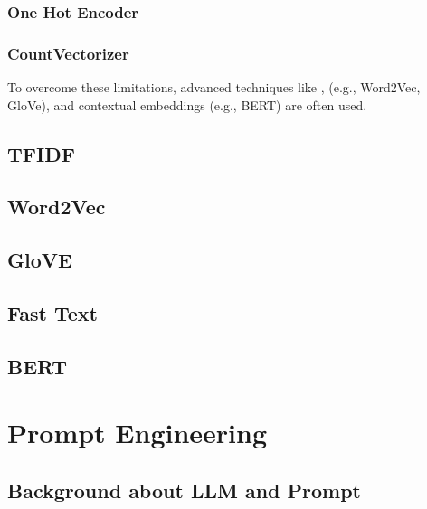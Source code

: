 \documentclass[letterpaper,11pt,english]{sphinxmanual}
\begin{document}
\subsection{One Hot Encoder}
\label{\detokenize{embedding:one-hot-encoder}}

\subsection{CountVectorizer}
\label{\detokenize{embedding:countvectorizer}}
\sphinxAtStartPar
To overcome these limitations, advanced techniques like ,  (e.g., Word2Vec, GloVe), and contextual embeddings (e.g., BERT) are often used.


\section{TF\sphinxhyphen{}IDF}
\label{\detokenize{embedding:tf-idf}}

\section{Word2Vec}
\label{\detokenize{embedding:word2vec}}

\section{GloVE}
\label{\detokenize{embedding:glove}}

\section{Fast Text}
\label{\detokenize{embedding:fast-text}}

\section{BERT}
\label{\detokenize{embedding:bert}}
\sphinxstepscope


\chapter{Prompt Engineering}
\label{\detokenize{prompt:prompt-engineering}}\label{\detokenize{prompt:prompt}}\label{\detokenize{prompt::doc}}

\section{Background about LLM and Prompt}
\label{\detokenize{prompt:background-about-llm-and-prompt}}
\end{document}
